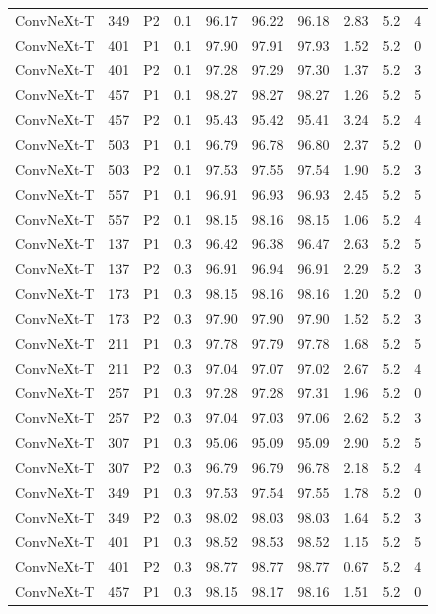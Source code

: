 {\begin{longtable}{lrllrrrrrr}
ConvNeXt-T & 349 & P2 & 0.1 & 96.17 & 96.22 & 96.18 & 2.83 & 5.2 & 4 \\
ConvNeXt-T & 401 & P1 & 0.1 & 97.90 & 97.91 & 97.93 & 1.52 & 5.2 & 0 \\
ConvNeXt-T & 401 & P2 & 0.1 & 97.28 & 97.29 & 97.30 & 1.37 & 5.2 & 3 \\
ConvNeXt-T & 457 & P1 & 0.1 & 98.27 & 98.27 & 98.27 & 1.26 & 5.2 & 5 \\
ConvNeXt-T & 457 & P2 & 0.1 & 95.43 & 95.42 & 95.41 & 3.24 & 5.2 & 4 \\
ConvNeXt-T & 503 & P1 & 0.1 & 96.79 & 96.78 & 96.80 & 2.37 & 5.2 & 0 \\
ConvNeXt-T & 503 & P2 & 0.1 & 97.53 & 97.55 & 97.54 & 1.90 & 5.2 & 3 \\
ConvNeXt-T & 557 & P1 & 0.1 & 96.91 & 96.93 & 96.93 & 2.45 & 5.2 & 5 \\
ConvNeXt-T & 557 & P2 & 0.1 & 98.15 & 98.16 & 98.15 & 1.06 & 5.2 & 4 \\
ConvNeXt-T & 137 & P1 & 0.3 & 96.42 & 96.38 & 96.47 & 2.63 & 5.2 & 5 \\
ConvNeXt-T & 137 & P2 & 0.3 & 96.91 & 96.94 & 96.91 & 2.29 & 5.2 & 3 \\
ConvNeXt-T & 173 & P1 & 0.3 & 98.15 & 98.16 & 98.16 & 1.20 & 5.2 & 0 \\
ConvNeXt-T & 173 & P2 & 0.3 & 97.90 & 97.90 & 97.90 & 1.52 & 5.2 & 3 \\
ConvNeXt-T & 211 & P1 & 0.3 & 97.78 & 97.79 & 97.78 & 1.68 & 5.2 & 5 \\
ConvNeXt-T & 211 & P2 & 0.3 & 97.04 & 97.07 & 97.02 & 2.67 & 5.2 & 4 \\
ConvNeXt-T & 257 & P1 & 0.3 & 97.28 & 97.28 & 97.31 & 1.96 & 5.2 & 0 \\
ConvNeXt-T & 257 & P2 & 0.3 & 97.04 & 97.03 & 97.06 & 2.62 & 5.2 & 3 \\
ConvNeXt-T & 307 & P1 & 0.3 & 95.06 & 95.09 & 95.09 & 2.90 & 5.2 & 5 \\
ConvNeXt-T & 307 & P2 & 0.3 & 96.79 & 96.79 & 96.78 & 2.18 & 5.2 & 4 \\
ConvNeXt-T & 349 & P1 & 0.3 & 97.53 & 97.54 & 97.55 & 1.78 & 5.2 & 0 \\
ConvNeXt-T & 349 & P2 & 0.3 & 98.02 & 98.03 & 98.03 & 1.64 & 5.2 & 3 \\
ConvNeXt-T & 401 & P1 & 0.3 & 98.52 & 98.53 & 98.52 & 1.15 & 5.2 & 5 \\
ConvNeXt-T & 401 & P2 & 0.3 & 98.77 & 98.77 & 98.77 & 0.67 & 5.2 & 4 \\
ConvNeXt-T & 457 & P1 & 0.3 & 98.15 & 98.17 & 98.16 & 1.51 & 5.2 & 0 \\

\end{longtable}}
